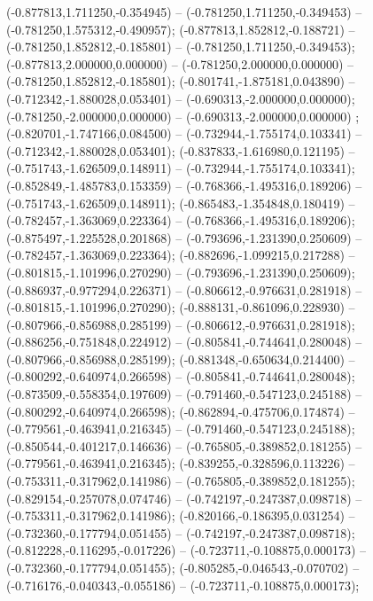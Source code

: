  (-0.877813,1.711250,-0.354945) -- (-0.781250,1.711250,-0.349453) -- (-0.781250,1.575312,-0.490957);
 (-0.877813,1.852812,-0.188721) -- (-0.781250,1.852812,-0.185801) -- (-0.781250,1.711250,-0.349453);
 (-0.877813,2.000000,0.000000) -- (-0.781250,2.000000,0.000000) -- (-0.781250,1.852812,-0.185801);
 (-0.801741,-1.875181,0.043890) -- (-0.712342,-1.880028,0.053401) -- (-0.690313,-2.000000,0.000000);
 (-0.781250,-2.000000,0.000000) -- (-0.690313,-2.000000,0.000000) ;
 (-0.820701,-1.747166,0.084500) -- (-0.732944,-1.755174,0.103341) -- (-0.712342,-1.880028,0.053401);
 (-0.837833,-1.616980,0.121195) -- (-0.751743,-1.626509,0.148911) -- (-0.732944,-1.755174,0.103341);
 (-0.852849,-1.485783,0.153359) -- (-0.768366,-1.495316,0.189206) -- (-0.751743,-1.626509,0.148911);
 (-0.865483,-1.354848,0.180419) -- (-0.782457,-1.363069,0.223364) -- (-0.768366,-1.495316,0.189206);
 (-0.875497,-1.225528,0.201868) -- (-0.793696,-1.231390,0.250609) -- (-0.782457,-1.363069,0.223364);
 (-0.882696,-1.099215,0.217288) -- (-0.801815,-1.101996,0.270290) -- (-0.793696,-1.231390,0.250609);
 (-0.886937,-0.977294,0.226371) -- (-0.806612,-0.976631,0.281918) -- (-0.801815,-1.101996,0.270290);
 (-0.888131,-0.861096,0.228930) -- (-0.807966,-0.856988,0.285199) -- (-0.806612,-0.976631,0.281918);
 (-0.886256,-0.751848,0.224912) -- (-0.805841,-0.744641,0.280048) -- (-0.807966,-0.856988,0.285199);
 (-0.881348,-0.650634,0.214400) -- (-0.800292,-0.640974,0.266598) -- (-0.805841,-0.744641,0.280048);
 (-0.873509,-0.558354,0.197609) -- (-0.791460,-0.547123,0.245188) -- (-0.800292,-0.640974,0.266598);
 (-0.862894,-0.475706,0.174874) -- (-0.779561,-0.463941,0.216345) -- (-0.791460,-0.547123,0.245188);
 (-0.850544,-0.401217,0.146636) -- (-0.765805,-0.389852,0.181255) -- (-0.779561,-0.463941,0.216345);
 (-0.839255,-0.328596,0.113226) -- (-0.753311,-0.317962,0.141986) -- (-0.765805,-0.389852,0.181255);
 (-0.829154,-0.257078,0.074746) -- (-0.742197,-0.247387,0.098718) -- (-0.753311,-0.317962,0.141986);
 (-0.820166,-0.186395,0.031254) -- (-0.732360,-0.177794,0.051455) -- (-0.742197,-0.247387,0.098718);
 (-0.812228,-0.116295,-0.017226) -- (-0.723711,-0.108875,0.000173) -- (-0.732360,-0.177794,0.051455);
 (-0.805285,-0.046543,-0.070702) -- (-0.716176,-0.040343,-0.055186) -- (-0.723711,-0.108875,0.000173);
